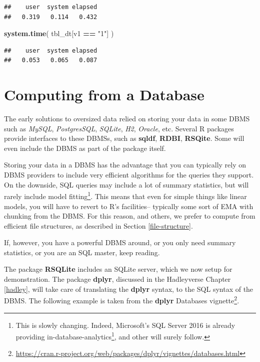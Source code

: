 \documentclass[]{book}
\newenvironment{Shaded}{\begin{snugshade}}{\end{snugshade}}
\newcommand{\KeywordTok}[1]{\textcolor[rgb]{0.13,0.29,0.53}{\textbf{#1}}}
\newcommand{\NormalTok}[1]{#1}
\newcommand{\OperatorTok}[1]{\textcolor[rgb]{0.81,0.36,0.00}{\textbf{#1}}}
\newcommand{\StringTok}[1]{\textcolor[rgb]{0.31,0.60,0.02}{#1}}
\renewcommand{\href}[2]{#2\footnote{\url{#1}}}
\theoremstyle{definition}
\theoremstyle{definition}
\theoremstyle{definition}
\theoremstyle{remark}
\begin{document}
\begin{verbatim}
##    user  system elapsed 
##   0.319   0.114   0.432
\end{verbatim}

\begin{Shaded}
\begin{Highlighting}[]
\KeywordTok{system.time}\NormalTok{( }
\NormalTok{  tbl_dt[v1 }\OperatorTok{==}\StringTok{ "1"}\NormalTok{] }
\NormalTok{  )}
\end{Highlighting}
\end{Shaded}

\begin{verbatim}
##    user  system elapsed 
##   0.053   0.065   0.087
\end{verbatim}

\hypertarget{computing-from-a-database}{%
\section{Computing from a Database}\label{computing-from-a-database}}

The early solutions to oversized data relied on storing your data in some DBMS such as \emph{MySQL}, \emph{PostgresSQL}, \emph{SQLite}, \emph{H2}, \emph{Oracle}, etc.
Several R packages provide interfaces to these DBMSs, such as \textbf{sqldf}, \textbf{RDBI}, \textbf{RSQite}.
Some will even include the DBMS as part of the package itself.

Storing your data in a DBMS has the advantage that you can typically rely on DBMS providers to include very efficient algorithms for the queries they support.
On the downside, SQL queries may include a lot of summary statistics, but will rarely include model fitting\footnote{This is slowly changing. Indeed, Microsoft's SQL Server 2016 is already providing \href{https://blogs.technet.microsoft.com/dataplatforminsider/2016/03/29/in-database-advanced-analytics-with-r-in-sql-server-2016/}{in-database-analytics}, and other will surely follow.}.
This means that even for simple things like linear models, you will have to revert to R's facilities-- typically some sort of EMA with chunking from the DBMS.
For this reason, and others, we prefer to compute from efficient file structures, as described in Section \ref{file-structure}.

If, however, you have a powerful DBMS around, or you only need summary statistics, or you are an SQL master, keep reading.

The package \textbf{RSQLite} includes an SQLite server, which we now setup for demonstration.
The package \textbf{dplyr}, discussed in the Hadleyverse Chapter \ref{hadley}, will take care of translating the \textbf{dplyr} syntax, to the SQL syntax of the DBMS.
The following example is taken from the \textbf{dplyr} \href{https://cran.r-project.org/web/packages/dplyr/vignettes/databases.html}{Databases vignette}.
\end{document}
